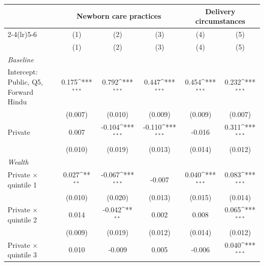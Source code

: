 {
\def\sym#1{\ifmmode^{#1}\else\(^{#1}\)\fi}
\begin{tabular}{l*{5}{c}}
\toprule
            &\multicolumn{3}{c}{Newborn care practices}                       &\multicolumn{2}{c}{Delivery circumstances} \\\cmidrule(lr){2-4}\cmidrule(lr){5-6}
            &\multicolumn{1}{c}{(1)}&\multicolumn{1}{c}{(2)}&\multicolumn{1}{c}{(3)}&\multicolumn{1}{c}{(4)}&\multicolumn{1}{c}{(5)}\\
            &\multicolumn{1}{c}{(1)}&\multicolumn{1}{c}{(2)}&\multicolumn{1}{c}{(3)}&\multicolumn{1}{c}{(4)}&\multicolumn{1}{c}{(5)}\\
\midrule
\textit{Baseline}&                     &                     &                     &                     &                     \\
\addlinespace
Intercept: Public, Q5, Forward Hindu&       0.175\sym{***}&       0.792\sym{***}&       0.447\sym{***}&       0.454\sym{***}&       0.232\sym{***}\\
            &     (0.007)         &     (0.010)         &     (0.009)         &     (0.009)         &     (0.007)         \\
\addlinespace
Private     &       0.007         &      -0.104\sym{***}&      -0.110\sym{***}&      -0.016         &       0.311\sym{***}\\
            &     (0.010)         &     (0.019)         &     (0.013)         &     (0.014)         &     (0.012)         \\
\addlinespace
\textit{Wealth}&                     &                     &                     &                     &                     \\
\addlinespace
Private $\times$ quintile 1&       0.027\sym{**} &      -0.067\sym{***}&      -0.007         &       0.040\sym{***}&       0.083\sym{***}\\
            &     (0.010)         &     (0.020)         &     (0.013)         &     (0.015)         &     (0.014)         \\
\addlinespace
Private $\times$ quintile 2&       0.014         &      -0.042\sym{**} &       0.002         &       0.008         &       0.065\sym{***}\\
            &     (0.009)         &     (0.019)         &     (0.012)         &     (0.014)         &     (0.012)         \\
\addlinespace
Private $\times$ quintile 3&       0.010         &      -0.009         &       0.005         &      -0.006         &       0.040\sym{***}\\

\end{tabular}}

